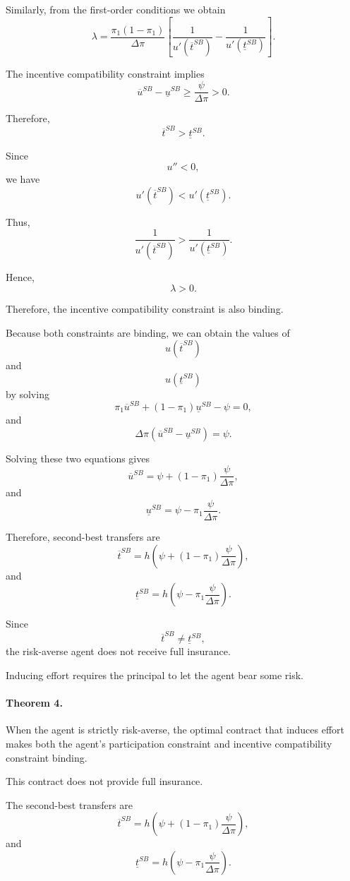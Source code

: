 Similarly, from the first-order conditions we obtain
\[
\lambda
=
\frac{\pi_1(1-\pi_1)}{\Delta\pi}
\left[
\frac{1}{u'(\overline t^{SB})}
-
\frac{1}{u'(\underline t^{SB})}
\right].
\]

The incentive compatibility constraint implies
\[
\overline u^{SB}-\underline u^{SB}
\ge
\frac{\psi}{\Delta\pi}>0.
\]

Therefore,
\[
\overline t^{SB}>\underline t^{SB}.
\]

Since
\[
u''<0,
\]
we have
\[
u'(\overline t^{SB})<u'(\underline t^{SB}).
\]

Thus,
\[
\frac{1}{u'(\overline t^{SB})}
>
\frac{1}{u'(\underline t^{SB})}.
\]

Hence,
\[
\lambda>0.
\]

Therefore, the incentive compatibility constraint is also binding.

Because both constraints are binding, we can obtain the values of
\[
u(\overline t^{SB})
\]
and
\[
u(\underline t^{SB})
\]
by solving
\[
\pi_1\overline u^{SB}
+
(1-\pi_1)\underline u^{SB}
-
\psi
=
0,
\]
and
\[
\Delta\pi
\left(
\overline u^{SB}-\underline u^{SB}
\right)
=
\psi.
\]

Solving these two equations gives
\[
\overline u^{SB}
=
\psi
+
(1-\pi_1)\frac{\psi}{\Delta\pi},
\]
and
\[
\underline u^{SB}
=
\psi
-
\pi_1\frac{\psi}{\Delta\pi}.
\]

Therefore, second-best transfers are
\[
\overline t^{SB}
=
h\left(
\psi
+
(1-\pi_1)\frac{\psi}{\Delta\pi}
\right),
\]
and
\[
\underline t^{SB}
=
h\left(
\psi
-
\pi_1\frac{\psi}{\Delta\pi}
\right).
\]

Since
\[
\overline t^{SB}\ne \underline t^{SB},
\]
the risk-averse agent does not receive full insurance.

Inducing effort requires the principal to let the agent bear some risk.

\paragraph{Theorem 4.}

When the agent is strictly risk-averse, the optimal contract that induces effort makes both the agent's participation constraint and incentive compatibility constraint binding.

This contract does not provide full insurance.

The second-best transfers are
\[
\overline t^{SB}
=
h\left(
\psi
+
(1-\pi_1)\frac{\psi}{\Delta\pi}
\right),
\]
and
\[
\underline t^{SB}
=
h\left(
\psi
-
\pi_1\frac{\psi}{\Delta\pi}
\right).
\]

